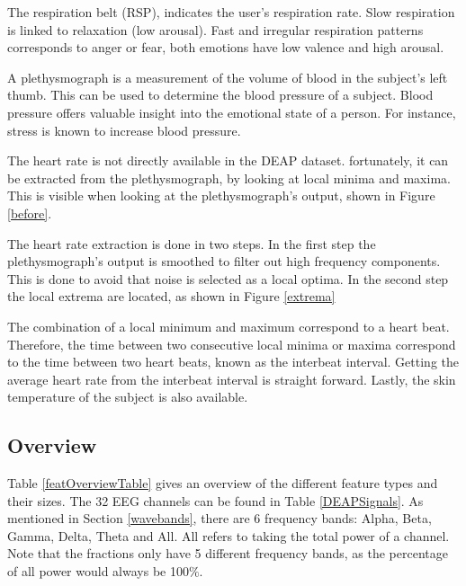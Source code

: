 \npar

The respiration belt (RSP), indicates the user's respiration rate. Slow respiration is linked to relaxation (low arousal). Fast and irregular respiration patterns corresponds to anger or fear, both emotions have low valence and high arousal\citep{DEAP}.

\npar

A plethysmograph is a measurement of the volume of blood in the subject's left thumb. This can be used to determine the blood pressure of a subject. Blood pressure offers valuable insight into the emotional state of a person. For instance, stress is known to increase blood pressure\citep{DEAP}.

\npar

The heart rate is not directly available in the DEAP dataset. fortunately, it can be extracted from the plethysmograph, by looking at local minima and maxima\citep{DEAP}. This is visible when looking at the plethysmograph's output, shown in Figure \ref{before}.


The heart rate extraction is done in two steps. In the first step the plethysmograph's output is smoothed to filter out high frequency components. This is done to avoid that noise is selected as a local optima. In the second step the local extrema are located, as shown in Figure \ref{extrema}


The combination of a local minimum and maximum correspond to a heart beat\citep{DEAP}. Therefore, the time between two consecutive local minima or maxima correspond to the time between two heart beats, known as the interbeat interval. Getting the average heart rate from the interbeat interval is straight forward. Lastly, the skin temperature of the subject is also available.

\clearpage

\subsection{Overview}

Table \ref{featOverviewTable} gives an overview of the different feature types and their sizes. The 32 EEG channels can be found in Table \ref{DEAPSignals}. As mentioned in Section \ref{wavebands}, there are 6 frequency bands: Alpha, Beta, Gamma, Delta, Theta and All. All refers to taking the total power of a channel. Note that the fractions only have 5 different frequency bands, as the percentage of all power would always be 100$\%$. 

